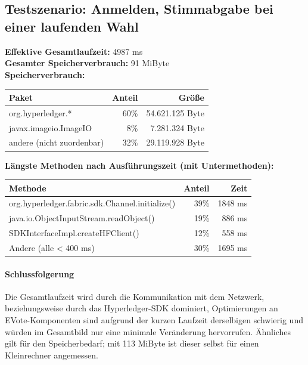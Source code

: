 \documentclass[parskip=full]{scrartcl}
\begin{document}
\subsection{Testszenario: Anmelden, Stimmabgabe bei einer laufenden Wahl}
\textbf{Effektive Gesamtlaufzeit:} 4987 ms\\
\textbf{Gesamter Speicherverbrauch:} 91 MiByte \\
\textbf{Speicherverbrauch:}

\begin{table}[h!]
	\begin{tabular}[t]{l r r}
		Paket & Anteil & Größe \\ \hline
		org.hyperledger.* & 60\% & 54.621.125 Byte \\
		javax.imageio.ImageIO & 8\% & 7.281.324 Byte \\
		andere (nicht zuordenbar) & 32\% & 29.119.928 Byte \\
	\end{tabular}
\end{table}

\textbf{Längste Methoden nach Ausführungszeit (mit Untermethoden):}
\begin{table}[h!]
	\begin{tabular}[t]{lrr}
		Methode & Anteil & Zeit \\ \hline
		org.hyperledger.fabric.sdk.Channel.initialize() & 39\% & 1848 ms \\
		java.io.ObjectInputStream.readObject() & 19\% & 886 ms \\
		SDKInterfaceImpl.createHFClient() & 12\% & 558 ms \\
		Andere (alle < 400 ms) & 30\% & 1695 ms 
	\end{tabular}
\end{table}

\paragraph{Schlussfolgerung}
Die Gesamtlaufzeit wird durch die Kommunikation mit dem Netzwerk, beziehungsweise durch das Hyperledger-SDK dominiert, Optimierungen an EVote-Komponenten sind aufgrund der kurzen Laufzeit derselbigen schwierig und würden im Gesamtbild nur eine minimale Veränderung hervorrufen. Ähnliches gilt für den Speicherbedarf; mit 113 MiByte ist dieser selbst für einen Kleinrechner angemessen.
\end{document}
